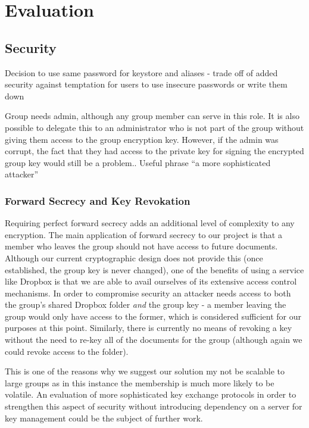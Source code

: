 
\chapter{Evaluation}
\label{cha:eval}
\section{Security}
Decision to use same password for keystore and aliases - trade off of added security against temptation for users to use insecure passwords or write them down

Group needs admin, although any group member can serve in this role.  It is also possible to delegate this to an administrator who is not part of the group without giving them access to the group encryption key.  However, if the admin was corrupt, the fact that they had access to the private key for signing the encrypted group key would still be a problem.. Useful phrase “a more sophisticated attacker”

\subsection*{Forward Secrecy and Key Revokation}
Requiring perfect forward secrecy adds an additional level of complexity to any encryption.   The main application of forward secrecy to our project is that a member who leaves the group should not have access to future documents.  Although our current cryptographic design does not provide this (once established, the group key is never changed), one of the benefits of using a service like Dropbox is that we are able to avail ourselves of its extensive access control mechanisms.  In order to compromise security an attacker needs access to both the group's shared Dropbox folder \textit{and } the group key - a member leaving the group would only have access to the former, which is considered sufficient for our purposes at this point.  Similarly, there is currently no means of revoking a key without the need to re-key all of the documents for the group (although again we could revoke access to the folder).   

This is one of the reasons why we suggest our solution my not be scalable to large groups as in this instance the membership is much more likely to be volatile.  An evaluation of more sophisticated key exchange protocols in order to strengthen this aspect of security without introducing dependency on a server for key management could be the subject of further work. 

